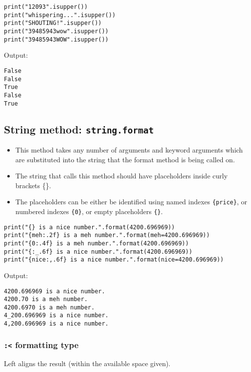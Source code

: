 \documentclass[11pt]{article}
\begin{document}
\begin{verbatim}
print("12093".isupper())
print("whispering...".isupper())
print("SHOUTING!".isupper())
print("39485943wow".isupper())
print("39485943WOW".isupper())
\end{verbatim}

 \noindent Output:

\begin{verbatim}
False
False
True
False
True
\end{verbatim}


 \newpage

\subsection{String method: \texttt{string.format}}
\label{sec:orge72129f}
\begin{itemize}
\item This method takes any number of arguments and keyword arguments which are substituted into the string that the format method is being called on.
\item The string that calls this method should have placeholders inside curly brackets \{\}.
\item The placeholders can be either be identified using named indexes \texttt{\{price\}}, or numbered indexes \texttt{\{0\}}, or empty placeholders \texttt{\{\}}.
\end{itemize}

\begin{verbatim}
print("{} is a nice number.".format(4200.696969))
print("{meh:.2f} is a meh number.".format(meh=4200.696969))
print("{0:.4f} is a meh number.".format(4200.696969))
print("{:_.6f} is a nice number.".format(4200.696969))
print("{nice:,.6f} is a nice number.".format(nice=4200.696969))
\end{verbatim}

 \noindent Output:

\begin{verbatim}
4200.696969 is a nice number.
4200.70 is a meh number.
4200.6970 is a meh number.
4_200.696969 is a nice number.
4,200.696969 is a nice number.
\end{verbatim}

\subsubsection{\texttt{:<} formatting type}
\label{sec:org4598715}
Left aligns the result (within the available space given).
\end{document}
